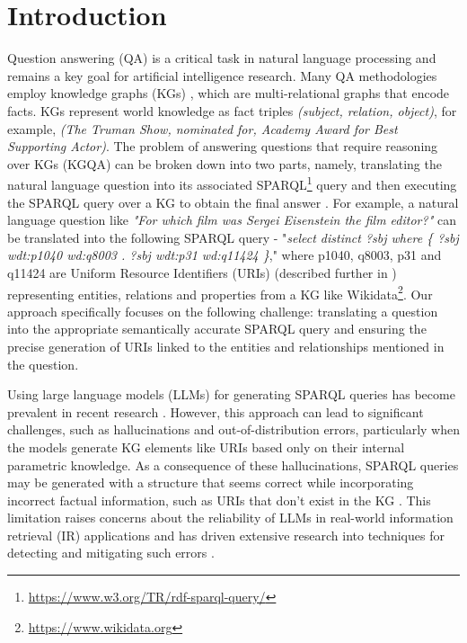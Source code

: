 \section{Introduction}
\label{sec:introduction}

Question answering (QA) is a critical task in natural language processing and remains a key goal for artificial intelligence research. Many QA methodologies employ knowledge graphs (KGs) \citep{saxena2020improving, kgqa_survey, kg_survey}, which are multi-relational graphs that encode facts.
KGs represent world knowledge as fact triples \textit{(subject, relation, object)}, for example, \textit{(The Truman Show, nominated for, Academy Award for Best Supporting Actor)}.
The problem of answering questions that require reasoning over KGs (KGQA) can be broken down into two parts, namely, translating the natural language question into its associated SPARQL\footnote{\url{https://www.w3.org/TR/rdf-sparql-query/}} query and then executing the SPARQL query over a KG to obtain the final answer \citep{banerjee}.
For example, a natural language question like \textit{"For which film was Sergei Eisenstein the film editor?"} can be translated into the following SPARQL query - "\textit{select distinct ?sbj where \{ ?sbj wdt:p1040 wd:q8003 . ?sbj wdt:p31 wd:q11424 \}}," where p1040, q8003, p31 and q11424 are Uniform Resource Identifiers (URIs) (described further in ) representing entities, relations and properties from a KG like Wikidata\footnote{\url{https://www.wikidata.org}}.
Our approach specifically focuses on the following challenge: translating a question into the appropriate semantically accurate SPARQL query and ensuring the precise generation of URIs linked to the entities and relationships mentioned in the question.

Using large language models (LLMs) for generating SPARQL queries has become prevalent in recent research \citep{meyer2024assessing, karou2023, banerjee, qi2024enhancing, Text2SPARQL}. However, this approach can lead to significant challenges, such as hallucinations and out-of-distribution errors, particularly when the models generate KG elements like URIs based only on their internal parametric knowledge. 
As a consequence of these hallucinations, SPARQL queries may be generated with a structure that seems correct while incorporating incorrect factual information, such as URIs that don't exist in the KG \citep{hallucination_survey_1, hallucination_survey_2, huang2021factual}. This limitation raises concerns about the reliability of LLMs in real-world information retrieval (IR) applications and has driven extensive research into techniques for detecting and mitigating such errors \citep{lin2024towards, varshney2023stitch, dhuliawala2023chain, chern2023factool, li2023halueval}.


